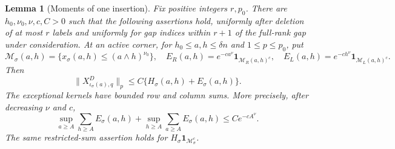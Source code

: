 \documentclass[11pt]{article}
\newtheorem{lemma}[theorem]{Lemma}
\theoremstyle{remark}
\theoremstyle{plain}
\newcommand{\one}{\mathbf 1}
\begin{document}
\begin{lemma}[Moments of one insertion]\label{lem:sp-insertion-moments}
Fix positive integers $r,p_0$.  There are
$h_0,\nu_0,\nu,c,C>0$ such that the following assertions hold, uniformly
after deletion of at most $r$ labels and uniformly for gap indices within
$r+1$ of the full-rank gap under consideration.  At an active corner,
for $h_0\le a,h\le\delta n$ and $1\le p\le p_0$, put
\[
 \mathcal M_\sigma(a,h)
       =\{x_\sigma(a,h)\le(a\wedge h)^{\nu_0}\},
 \quad
 E_R(a,h)=e^{-ca^\nu}\one_{\mathcal M_R(a,h)^c},\quad
 E_L(a,h)=e^{-ch^\nu}\one_{\mathcal M_L(a,h)^c}.
\]
Then
\begin{equation}\label{eq:sp-insertion-lp}
 \|X_{\iota_\sigma(a),q}^D\|_p
                  \le C\{H_\sigma(a,h)+E_\sigma(a,h)\}.
\end{equation}
The exceptional kernels have bounded row and column sums.  More precisely,
after decreasing $\nu$ and $c$,
\begin{equation}\label{eq:sp-extreme-restricted-sums}
 \sup_{a\ge A}\sum_{h\ge A}E_\sigma(a,h)
 +\sup_{h\ge A}\sum_{a\ge A}E_\sigma(a,h)
 \le Ce^{-cA^\nu}.
\end{equation}
The same restricted-sum assertion holds for
$H_\sigma\one_{\mathcal M_\sigma^c}$.
\end{lemma}
\end{document}
